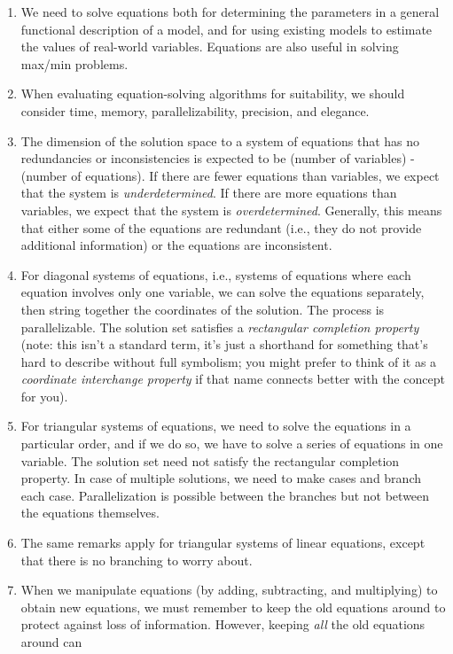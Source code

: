 \documentclass[10pt]{amsart}
\begin{document}
\begin{enumerate}
\item We need to solve equations both for determining the parameters
  in a general functional description of a model, and for using
  existing models to estimate the values of real-world
  variables. Equations are also useful in solving max/min problems.
\item When evaluating equation-solving algorithms for suitability, we
  should consider time, memory, parallelizability, precision, and
  elegance.
\item The dimension of the solution space to a system of equations
  that has no redundancies or inconsistencies is expected to be
  (number of variables) - (number of equations). If there are fewer
  equations than variables, we expect that the system is {\em
    underdetermined}. If there are more equations than variables, we
  expect that the system is {\em overdetermined}. Generally, this
  means that either some of the equations are redundant (i.e., they do
  not provide additional information) or the equations are
  inconsistent.
\item For diagonal systems of equations, i.e., systems of equations
  where each equation involves only one variable, we can solve the
  equations separately, then string together the coordinates of the
  solution. The process is parallelizable. The solution set satisfies
  a {\em rectangular completion property} (note: this isn't a standard
  term, it's just a shorthand for something that's hard to describe
  without full symbolism; you might prefer to think of it as a {\em
    coordinate interchange property} if that name connects better with
  the concept for you).
\item For triangular systems of equations, we need to solve the
  equations in a particular order, and if we do so, we have to solve a
  series of equations in one variable. The solution set need not
  satisfy the rectangular completion property. In case of multiple
  solutions, we need to make cases and branch each
  case. Parallelization is possible between the branches but not
  between the equations themselves.
\item The same remarks apply for triangular systems of linear
  equations, except that there is no branching to worry about.
\item When we manipulate equations (by adding, subtracting, and
  multiplying) to obtain new equations, we must remember to keep the
  old equations around to protect against loss of
  information. However, keeping {\em all} the old equations around can

\end{enumerate}
\end{document}
